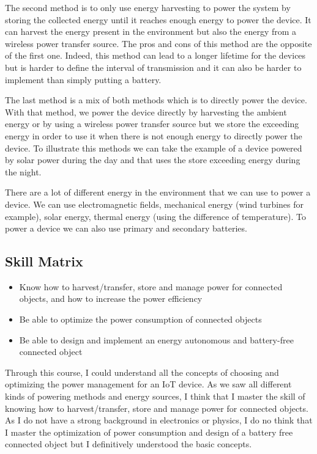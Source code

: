 The second method is to only use energy harvesting to power the system by storing the collected energy until it reaches enough energy to power the device. It can harvest the energy present in the environment but also the energy from a wireless power transfer source. The pros and cons of this method are the opposite of the first one. Indeed, this method can lead to a longer lifetime for the devices but is harder to define the interval of transmission and it can also be harder to implement than simply putting a battery. 
\\\par

The last method is a mix of both methods which is to directly power the device. With that method, we power the device directly by harvesting the ambient energy or by using a wireless power transfer source but we store the exceeding energy in order to use it when there is not enough energy to directly power the device. To illustrate this methods we can take the example of a device powered by solar power during the day and that uses the store exceeding energy during the night.
\\\par

There are a lot of different energy in the environment that we can use to power a device. We can use electromagnetic fields, mechanical energy (wind turbines for example), solar energy, thermal energy (using the difference of temperature). To power a device we can also use primary and secondary batteries.

\subsection{Skill Matrix}

\begin{itemize}
    \item Know how to harvest/transfer, store and manage power for connected objects, and how to increase the power efficiency
    \item Be able to optimize the power consumption of connected objects
    \item Be able to design and implement an energy autonomous and battery-free connected object
\end{itemize}

Through this course, I could understand all the concepts of choosing and optimizing the power management for an IoT device. As we saw all different kinds of powering methods and energy sources, I think that I master the skill of knowing how to harvest/transfer, store and manage power for connected objects. As I do not have a strong background in electronics or physics, I do no think that I master the optimization of  power consumption and design of a battery free connected object but I definitively understood the basic concepts.

